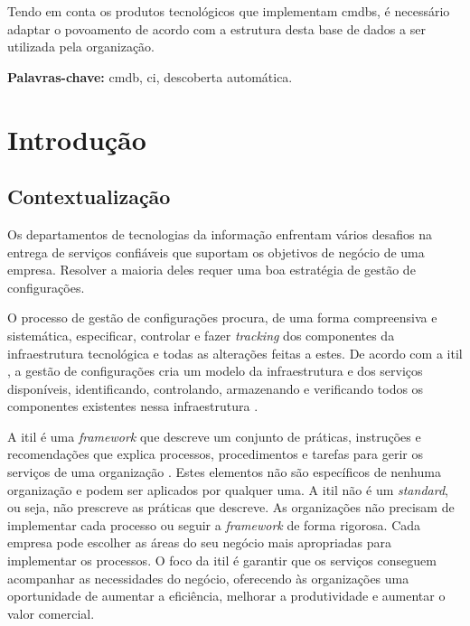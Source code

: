 \documentclass[
  oneside,
  11pt, a4paper,
  footinclude=true,
  headinclude=true,
  cleardoublepage=empty
]{scrbook}
\begin{document}
Tendo em conta os produtos tecnológicos que implementam \glspl{cmdb}, é necessário adaptar o povoamento de acordo com a estrutura desta base de dados a ser utilizada pela organização.

\vspace{1cm}	
\textbf{Palavras-chave:} \gls{cmdb}, \gls{ci}, descoberta automática.
	
	\tableofcontents
	\listoftables
	\printglossary[type=\acronymtype, style=treenoname]
    \clearpage
    \thispagestyle{empty}
	
	
	
	\chapter{Introdução}
	\label{cap:introducao}
	
	\section{Contextualização}
	
Os departamentos de tecnologias da informação enfrentam vários desafios na entrega de serviços confiáveis que suportam os objetivos de negócio de uma empresa. Resolver a maioria deles requer uma boa estratégia de gestão de configurações.

O processo de gestão de configurações procura, de uma forma compreensiva e sistemática, especificar, controlar e fazer \textit{tracking} dos componentes da infraestrutura tecnológica e todas as alterações feitas a estes. De acordo com a \gls{itil} \cite{itil4}, a gestão de configurações cria um modelo da infraestrutura e dos serviços disponíveis, identificando, controlando, armazenando e verificando todos os componentes existentes nessa infraestrutura \cite{cmdb5steps}. 

A \gls{itil} é uma \textit{framework} que descreve um conjunto de práticas, instruções e recomendações que explica processos, procedimentos e tarefas para gerir os serviços de uma organização \cite{baron2010configuration}. Estes elementos não são específicos de nenhuma organização e podem ser aplicados por qualquer uma. A \gls{itil} não é um \textit{standard}, ou seja, não prescreve as práticas que descreve. As organizações não precisam de implementar cada processo ou seguir a \textit{framework} de forma rigorosa. Cada empresa pode escolher as áreas do seu negócio mais apropriadas para implementar os processos. O foco da \gls{itil} é garantir que os serviços conseguem acompanhar as necessidades do negócio, oferecendo às organizações uma oportunidade de aumentar a eficiência, melhorar a produtividade e aumentar o valor comercial.
\end{document}
